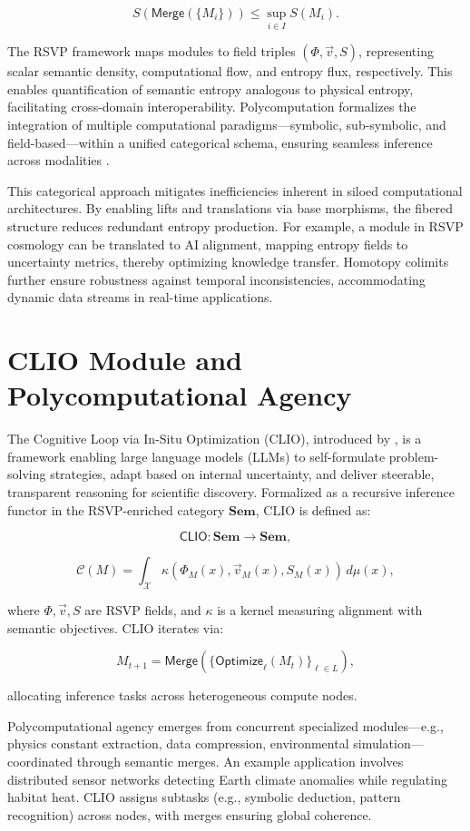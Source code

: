 \documentclass[12pt]{article}
\begin{document}
\[ S(\mathsf{Merge}(\{M_i\})) \leq \sup_{i \in I} S(M_i). \]

The RSVP framework maps modules to field triples $ (\Phi, \vec{v}, S) $, representing scalar semantic density, computational flow, and entropy flux, respectively. This enables quantification of semantic entropy analogous to physical entropy, facilitating cross-domain interoperability. Polycomputation formalizes the integration of multiple computational paradigms—symbolic, sub-symbolic, and field-based—within a unified categorical schema, ensuring seamless inference across modalities \citep{AbramskyCoecke2004}.

This categorical approach mitigates inefficiencies inherent in siloed computational architectures. By enabling lifts and translations via base morphisms, the fibered structure reduces redundant entropy production. For example, a module in RSVP cosmology can be translated to AI alignment, mapping entropy fields to uncertainty metrics, thereby optimizing knowledge transfer. Homotopy colimits further ensure robustness against temporal inconsistencies, accommodating dynamic data streams in real-time applications.

\section{CLIO Module and Polycomputational Agency}
\label{sec:clio-polyagency}

The Cognitive Loop via In-Situ Optimization (CLIO), introduced by \citet{ChengBroadbentChappell2025}, is a framework enabling large language models (LLMs) to self-formulate problem-solving strategies, adapt based on internal uncertainty, and deliver steerable, transparent reasoning for scientific discovery. Formalized as a recursive inference functor in the RSVP-enriched category $ \mathbf{Sem} $, CLIO is defined as:

\[ \mathsf{CLIO}: \mathbf{Sem} \to \mathbf{Sem}, \]

\[ \mathcal{C}(M) = \int_{\mathcal{X}} \kappa(\Phi_M(x), \vec{v}_M(x), S_M(x)) \, d\mu(x), \]

where $ \Phi, \vec{v}, S $ are RSVP fields, and $ \kappa $ is a kernel measuring alignment with semantic objectives. CLIO iterates via:

\[ M_{t+1} = \mathsf{Merge}(\{ \mathsf{Optimize}_\ell(M_t) \}_{\ell \in L}), \]

allocating inference tasks across heterogeneous compute nodes.

Polycomputational agency emerges from concurrent specialized modules—e.g., physics constant extraction, data compression, environmental simulation—coordinated through semantic merges. An example application involves distributed sensor networks detecting Earth climate anomalies while regulating habitat heat. CLIO assigns subtasks (e.g., symbolic deduction, pattern recognition) across nodes, with merges ensuring global coherence.
\end{document}
